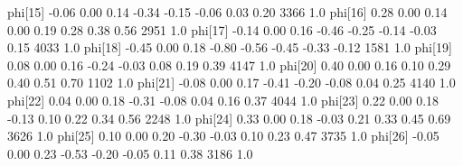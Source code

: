 \documentclass[]{tufte-handout}
\newenvironment{Shaded}{}{}
\newcommand{\DecValTok}[1]{\textcolor[rgb]{0.25,0.63,0.44}{#1}}
\newcommand{\FloatTok}[1]{\textcolor[rgb]{0.25,0.63,0.44}{#1}}
\newcommand{\NormalTok}[1]{#1}
\begin{document}
\begin{Shaded}
\begin{Highlighting}[]
{\NormalTok{phi[}\DecValTok{15}\NormalTok{]   }\FloatTok{-0.06}    \FloatTok{0.00} \FloatTok{0.14}   \FloatTok{-0.34}   \FloatTok{-0.15}   \FloatTok{-0.06}    \FloatTok{0.03}    \FloatTok{0.20}  \DecValTok{3366}  \FloatTok{1.0}
\NormalTok{phi[}\DecValTok{16}\NormalTok{]    }\FloatTok{0.28}    \FloatTok{0.00} \FloatTok{0.14}    \FloatTok{0.00}    \FloatTok{0.19}    \FloatTok{0.28}    \FloatTok{0.38}    \FloatTok{0.56}  \DecValTok{2951}  \FloatTok{1.0}
\NormalTok{phi[}\DecValTok{17}\NormalTok{]   }\FloatTok{-0.14}    \FloatTok{0.00} \FloatTok{0.16}   \FloatTok{-0.46}   \FloatTok{-0.25}   \FloatTok{-0.14}   \FloatTok{-0.03}    \FloatTok{0.15}  \DecValTok{4033}  \FloatTok{1.0}
\NormalTok{phi[}\DecValTok{18}\NormalTok{]   }\FloatTok{-0.45}    \FloatTok{0.00} \FloatTok{0.18}   \FloatTok{-0.80}   \FloatTok{-0.56}   \FloatTok{-0.45}   \FloatTok{-0.33}   \FloatTok{-0.12}  \DecValTok{1581}  \FloatTok{1.0}
\NormalTok{phi[}\DecValTok{19}\NormalTok{]    }\FloatTok{0.08}    \FloatTok{0.00} \FloatTok{0.16}   \FloatTok{-0.24}   \FloatTok{-0.03}    \FloatTok{0.08}    \FloatTok{0.19}    \FloatTok{0.39}  \DecValTok{4147}  \FloatTok{1.0}
\NormalTok{phi[}\DecValTok{20}\NormalTok{]    }\FloatTok{0.40}    \FloatTok{0.00} \FloatTok{0.16}    \FloatTok{0.10}    \FloatTok{0.29}    \FloatTok{0.40}    \FloatTok{0.51}    \FloatTok{0.70}  \DecValTok{1102}  \FloatTok{1.0}
\NormalTok{phi[}\DecValTok{21}\NormalTok{]   }\FloatTok{-0.08}    \FloatTok{0.00} \FloatTok{0.17}   \FloatTok{-0.41}   \FloatTok{-0.20}   \FloatTok{-0.08}    \FloatTok{0.04}    \FloatTok{0.25}  \DecValTok{4140}  \FloatTok{1.0}
\NormalTok{phi[}\DecValTok{22}\NormalTok{]    }\FloatTok{0.04}    \FloatTok{0.00} \FloatTok{0.18}   \FloatTok{-0.31}   \FloatTok{-0.08}    \FloatTok{0.04}    \FloatTok{0.16}    \FloatTok{0.37}  \DecValTok{4044}  \FloatTok{1.0}
\NormalTok{phi[}\DecValTok{23}\NormalTok{]    }\FloatTok{0.22}    \FloatTok{0.00} \FloatTok{0.18}   \FloatTok{-0.13}    \FloatTok{0.10}    \FloatTok{0.22}    \FloatTok{0.34}    \FloatTok{0.56}  \DecValTok{2248}  \FloatTok{1.0}
\NormalTok{phi[}\DecValTok{24}\NormalTok{]    }\FloatTok{0.33}    \FloatTok{0.00} \FloatTok{0.18}   \FloatTok{-0.03}    \FloatTok{0.21}    \FloatTok{0.33}    \FloatTok{0.45}    \FloatTok{0.69}  \DecValTok{3626}  \FloatTok{1.0}
\NormalTok{phi[}\DecValTok{25}\NormalTok{]    }\FloatTok{0.10}    \FloatTok{0.00} \FloatTok{0.20}   \FloatTok{-0.30}   \FloatTok{-0.03}    \FloatTok{0.10}    \FloatTok{0.23}    \FloatTok{0.47}  \DecValTok{3735}  \FloatTok{1.0}
\NormalTok{phi[}\DecValTok{26}\NormalTok{]   }\FloatTok{-0.05}    \FloatTok{0.00} \FloatTok{0.23}   \FloatTok{-0.53}   \FloatTok{-0.20}   \FloatTok{-0.05}    \FloatTok{0.11}    \FloatTok{0.38}  \DecValTok{3186}  \FloatTok{1.0}
}
\end{Highlighting}
\end{Shaded}
\end{document}
